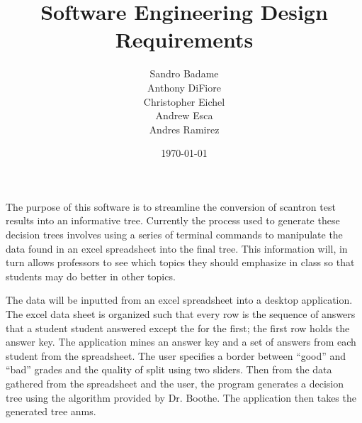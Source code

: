 \documentclass{article}
\begin{document}
\title{Software Engineering Design Requirements}
\author{
Sandro Badame\\
Anthony DiFiore\\
Christopher Eichel\\
Andrew Esca\\
Andres Ramirez
}
\date{\today}
\maketitle
The purpose of this software is to streamline the conversion of scantron test results into an informative  tree. Currently the process used to generate these decision trees involves using a series of terminal commands to manipulate the data found in an excel spreadsheet into the final tree. This information will, in turn allows professors to see which topics they should emphasize in class so  that students may do better in other topics.

The data will be inputted from an excel spreadsheet into a desktop application. The excel data sheet is organized such that every row is the sequence of answers that a student student answered except the for the first; the first row holds the answer key. The application mines an answer key and a set of answers from each student from the spreadsheet. The user specifies a border between ``good'' and ``bad'' grades and the quality of split using two sliders. Then from the data gathered from the spreadsheet and the user, the program generates a decision tree using the algorithm provided by Dr. Boothe. The application then takes the generated tree anms.
\end{document}
